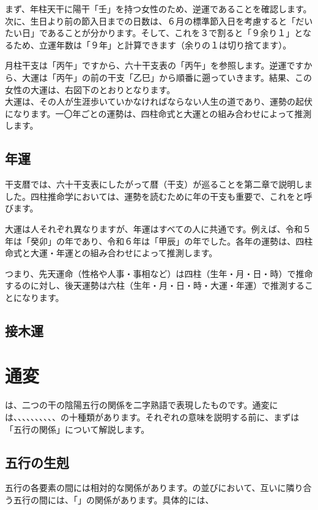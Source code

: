 \documentclass[a5paper,11pt,dvipdfmx]{tarticle}
\begin{document}
まず、年柱天干に陽干「壬」を持つ女性のため、逆運であることを確認します。次に、生日より前の節入日までの日数は、６月の標準節入日を考慮すると「だいたい日」であることが分かります。そして、これを３で割ると「９余り１」となるため、立運年数は「９年」と計算できます（余りの１は切り捨てます）。

月柱干支は「丙午」ですから、六十干支表の「丙午」を参照します。逆運ですから、大運は「丙午」の前の干支「乙巳」から順番に遡っていきます。結果、この女性の大運は、右図下のとおりとなります。\\

大運は、その人が生涯歩いていかなければならない人生の道であり、運勢の起伏になります。一〇年ごとの運勢は、四柱命式と大運との組み合わせによって推測します。

\subsection{年運}
干支暦では、六十干支表にしたがって暦（干支）が巡ることを第二章で説明しました。四柱推命学においては、運勢を読むために年の干支も重要で、これをと呼びます。

大運は人それぞれ異なりますが、年運はすべての人に共通です。例えば、令和５年は「癸卯」の年であり、令和６年は「甲辰」の年でした。各年の運勢は、四柱命式と大運・年運との組み合わせによって推測します。

つまり、先天運命（性格や人事・事相など）は四柱（生年・月・日・時）で推命するのに対し、後天運勢は六柱（生年・月・日・時・大運・年運）で推測することになります。

\subsection{接木運}

\clearpage

\section{通変}

は、二つの干の陰陽五行の関係を二字熟語で表現したものです。通変には、、、、、、、、、、の十種類があります。それぞれの意味を説明する前に、まずは「五行の関係」について解説します。

\subsection{五行の生剋}
五行の各要素の間には相対的な関係があります。の並びにおいて、互いに隣り合う五行の間には、「」の関係があります。具体的には、
\end{document}
